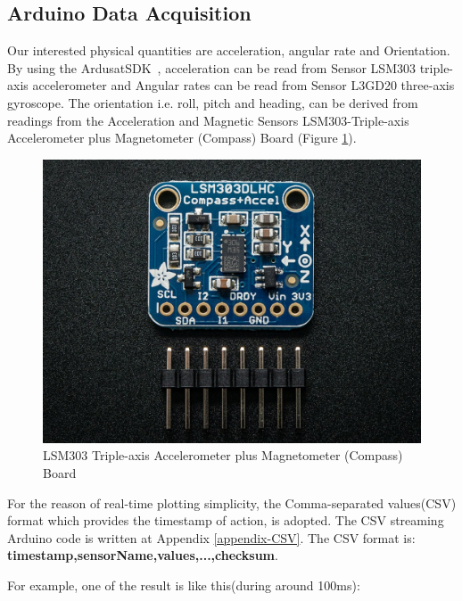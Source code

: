 \subsection{Arduino Data Acquisition}
Our interested physical quantities are acceleration, angular rate and Orientation. By using the ArdusatSDK~\cite{ardusatsdk}, acceleration can be read from Sensor LSM303 triple-axis accelerometer and Angular rates can be read from Sensor L3GD20 three-axis gyroscope. The orientation i.e. roll, pitch and heading, can be derived from readings from the Acceleration and Magnetic Sensors LSM303-Triple-axis Accelerometer plus Magnetometer (Compass) Board (Figure \ref{compass board}).

\begin{figure}[!b]
\centering
\includegraphics{fig/DOE/LSM}
\caption{LSM303 Triple-axis Accelerometer plus Magnetometer (Compass) Board}\label{compass board}
\end{figure}

For the reason of real-time plotting simplicity, the Comma-separated values(CSV) format which provides the timestamp of action, is adopted. The CSV streaming Arduino code is written at Appendix \ref{appendix-CSV}. The CSV format is: \textbf{timestamp,sensorName,values,...,checksum}.

For example, one of the result is like this(during around 100ms):

